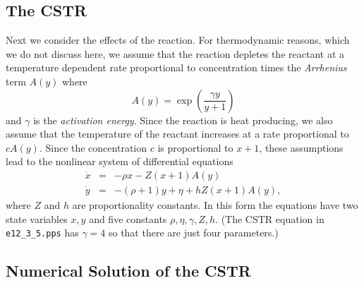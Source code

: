 \documentclass{ximera}
\begin{document}
\subsection*{The CSTR}
 
Next we consider the effects of the reaction.  For thermodynamic
reasons, which we do not discuss here, we assume that the
reaction depletes the reactant at a temperature dependent rate
proportional to concentration times the {\em Arrhenius\/} term
 $A(y)$ where
\[
A(y) = \exp\left(\frac{\gamma y}{y+1}\right)
\]
and $\gamma$ is the {\em activation 
energy\/}.  Since the
reaction is heat producing, we also assume that the temperature
of the reactant increases at a rate proportional to $cA(y)$.
Since the concentration $c$ is proportional to $x+1$, these
assumptions lead to the nonlinear system of differential
equations
\begin{equation*} \label{e:CSTR}
\begin{array}{rcl}
\dot{x} & = & -\rho x  - Z(x+1)A(y) \\
\dot{y} & = & -(\rho+1)y + \eta + hZ(x+1)A(y),
\end{array}
\end{equation*}
where $Z$ and $h$ are proportionality constants.  In this form
the equations have two state variables $x,y$ and five constants
$\rho,\eta,\gamma,Z,h$.  (The CSTR equation in {\tt e12\_3\_5.pps} has
$\gamma=4$ so that there are just four parameters.)

\subsection*{Numerical Solution of the CSTR}
\end{document}
